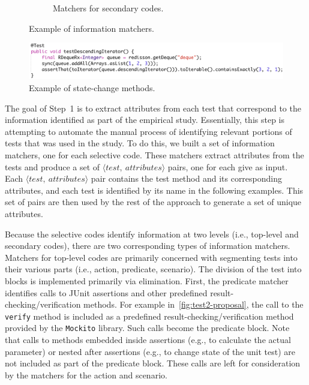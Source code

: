 \begin{figure}[t]
\begin{subfigure}[b]{0.5\textwidth}
\caption{Matchers for secondary codes.}
\label{fig:matcher2}
\end{subfigure}
\caption{Example of information matchers.}
\label{fig:information-matcher}
\end{figure}

\begin{figure}[t]
\centering
\includegraphics[scale=0.34]{figures/new-state-change.png}
\caption{Example of state-change methods.}
\label{fig:state-change}
\end{figure}


The goal of Step~1 is to extract attributes from each test that correspond to the information identified as part of the empirical study.
%
Essentially, this step is attempting to automate the manual process of identifying relevant portions of tests that was used in the study.
%
To do this, we built a set of information matchers, one for each selective code.
% 
These matchers extract attributes from the tests and produce a set of $\langle test,~attributes \rangle$ pairs, one for each give as input.
%
Each $\langle test,~attributes \rangle$ pair contains the test method and its corresponding attributes, and each test is identified by its name in the following examples.
%
This set of pairs are then used by the rest of the approach to generate a set of unique attributes.


Because the selective codes identify information at two levels (i.e., top-level and secondary codes), there are two corresponding types of information matchers.
%
Matchers for top-level codes are primarily concerned with segmenting tests into their various parts (i.e., action, predicate, scenario).
% 
The division of the test into blocks is implemented primarily via elimination.
%
First, the predicate matcher identifies calls to JUnit assertions and other predefined result-checking\slash verification methods.
%
For example in~\cref{fig:test2-proposal}, the call to the \texttt{verify} method is included as a predefined result-checking\slash verification method provided by the \texttt{Mockito} library.
%
Such calls become the predicate block.
% 
Note that calls to methods embedded inside assertions (e.g., to calculate the actual parameter) or nested after assertions (e.g., to change state of the unit test) are not included as part of the predicate block.
%
These calls are left for consideration by the matchers for the action and scenario.


